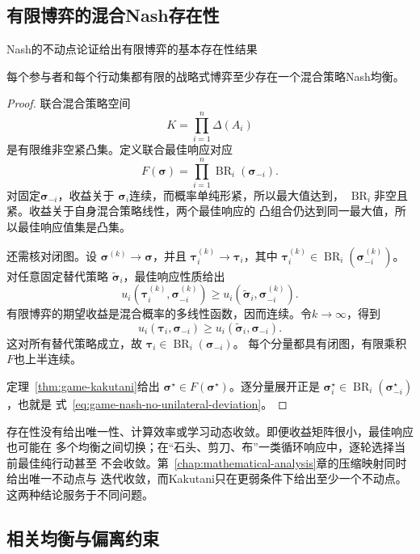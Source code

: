 \subsection{有限博弈的混合Nash存在性}

Nash的不动点论证给出有限博弈的基本存在性结果
\begin{theorem}[有限博弈存在混合Nash均衡]
\label{thm:game-nash-existence}
每个参与者和每个行动集都有限的战略式博弈至少存在一个混合策略Nash均衡。
\end{theorem}

\begin{proof}
联合混合策略空间
\[
  K=\prod_{i=1}^{n}\Delta(A_i)
\]
是有限维非空紧凸集。定义联合最佳响应对应
\[
  F(\bm{\sigma})
  =
  \prod_{i=1}^{n}
  \operatorname{BR}_i(\bm{\sigma}_{-i}).
\]
对固定\(\bm{\sigma}_{-i}\)，收益关于
\(\bm{\sigma}_i\)连续，而概率单纯形紧，所以最大值达到，
\(\operatorname{BR}_i\)非空且紧。收益关于自身混合策略线性，两个最佳响应的
凸组合仍达到同一最大值，所以最佳响应值集是凸集。

还需核对闭图。设
\(\bm{\sigma}^{(k)}\to\bm{\sigma}\)，并且
\(\bm{\tau}_i^{(k)}\to\bm{\tau}_i\)，其中
\(\bm{\tau}_i^{(k)}
\in\operatorname{BR}_i(\bm{\sigma}_{-i}^{(k)})\)。对任意固定替代策略
\(\widetilde{\bm{\sigma}}_i\)，最佳响应性质给出
\[
  u_i(\bm{\tau}_i^{(k)},\bm{\sigma}_{-i}^{(k)})
  \geq
  u_i(\widetilde{\bm{\sigma}}_i,\bm{\sigma}_{-i}^{(k)}).
\]
有限博弈的期望收益是混合概率的多线性函数，因而连续。令\(k\to\infty\)，得到
\[
  u_i(\bm{\tau}_i,\bm{\sigma}_{-i})
  \geq
  u_i(\widetilde{\bm{\sigma}}_i,\bm{\sigma}_{-i}).
\]
这对所有替代策略成立，故
\(\bm{\tau}_i\in\operatorname{BR}_i(\bm{\sigma}_{-i})\)。
每个分量都具有闭图，有限乘积\(F\)也上半连续。

定理~\ref{thm:game-kakutani}给出
\(\bm{\sigma}^\star\in F(\bm{\sigma}^\star)\)。逐分量展开正是
\(\bm{\sigma}_i^\star
\in\operatorname{BR}_i(\bm{\sigma}_{-i}^\star)\)，也就是
式~\eqref{eq:game-nash-no-unilateral-deviation}。
\end{proof}

存在性没有给出唯一性、计算效率或学习动态收敛。即便收益矩阵很小，最佳响应也可能在
多个均衡之间切换；在“石头、剪刀、布”一类循环响应中，逐轮选择当前最佳纯行动甚至
不会收敛。第~\ref{chap:mathematical-analysis}章的压缩映射同时给出唯一不动点与
迭代收敛，而Kakutani只在更弱条件下给出至少一个不动点。这两种结论服务于不同问题。

\subsection{相关均衡与偏离约束}

